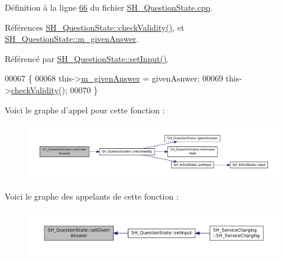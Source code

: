 Définition à la ligne \hyperlink{SH__QuestionState_8cpp_source_l00066}{66} du fichier \hyperlink{SH__QuestionState_8cpp_source}{S\-H\-\_\-\-Question\-State.\-cpp}.



Références \hyperlink{classSH__QuestionState_a3ca5459c20ef591023c0572d8224146c}{S\-H\-\_\-\-Question\-State\-::check\-Validity()}, et \hyperlink{classSH__QuestionState_a309bb96a6aed67d190f9ab995fdc7c61}{S\-H\-\_\-\-Question\-State\-::m\-\_\-given\-Answer}.



Référencé par \hyperlink{classSH__QuestionState_a331222d371d9c97392f35c84a5ef43e1}{S\-H\-\_\-\-Question\-State\-::set\-Input()}.


\begin{DoxyCode}
00067 \{
00068     this->\hyperlink{classSH__QuestionState_a309bb96a6aed67d190f9ab995fdc7c61}{m\_givenAnswer} = givenAsnwer;
00069     this->\hyperlink{classSH__QuestionState_a3ca5459c20ef591023c0572d8224146c}{checkValidity}();
00070 \}
\end{DoxyCode}


Voici le graphe d'appel pour cette fonction \-:\nopagebreak
\begin{figure}[H]
\begin{center}
\leavevmode
\includegraphics[width=350pt]{classSH__QuestionState_a9d285a34a7002fd05a7fa8ff9139c264_cgraph}
\end{center}
\end{figure}




Voici le graphe des appelants de cette fonction \-:\nopagebreak
\begin{figure}[H]
\begin{center}
\leavevmode
\includegraphics[width=350pt]{classSH__QuestionState_a9d285a34a7002fd05a7fa8ff9139c264_icgraph}
\end{center}
\end{figure}



